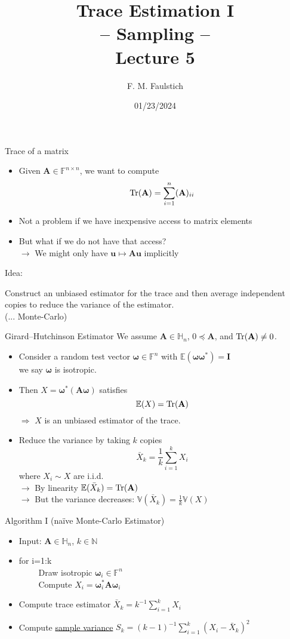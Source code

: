 \documentclass{beamer}
\title{
Trace Estimation I\\
-- Sampling -- \\
Lecture 5
}
\author{F. M. Faulstich}
\date{01/23/2024}
\newcommand{\bgk}[1]{\boldsymbol{#1}}
\newcommand{\bomega}{\bgk{\omega}}
\newcommand{\bvec}[1]{\mathbf{#1}}
\newcommand{\vu}{\bvec{u}}
\newcommand{\vA}{\bvec{A}}
\newcommand{\vI}{\bvec{I}}
\newcommand{\bitem}{\item[$\bullet$]}
\begin{document}
\frame{\titlepage}

\begin{frame}{Trace of a matrix}

\begin{itemize}
    \bitem Given $\vA \in \mathbb{F}^{n\times n}$, we want to compute
$$
{\rm Tr}(\vA) = \sum_{i=1}^{n} (\vA)_{ii} 
$$
\bitem Not a problem if we have inexpensive access to matrix elements
\bitem But what if we do not have that access?\\
$\rightarrow$ We might only have $\vu \mapsto \vA \vu$ implicitly
\end{itemize}

 

Idea:\\
\begin{center}
Construct an unbiased estimator for the trace and then average independent copies to reduce the variance of the estimator. \\
\pause
(... Monte-Carlo)
\end{center}
    
\end{frame}


\begin{frame}{Girard--Hutchinson Estimator}
We assume $\vA \in \mathbb{H}_n$, $0 \preccurlyeq \vA$, and ${\rm Tr}(\vA) \neq 0$.
\begin{itemize}
    \bitem Consider a random test vector $\bomega\in\mathbb{F}^n$ with $\mathbb{E}(\bomega \bomega^*) = \vI$\\
    we say $\bomega$ is isotropic.
    \bitem Then $X = \bomega^* (\vA \bomega)$ satisfies
    $$
    \mathbb{E}(X) = {\rm Tr}(\vA)
    $$
    $\Rightarrow$ $X$ is an unbiased estimator of the trace.
    \pause 
    \bitem [Girard--Hutchinson Estimator] Reduce the variance by taking $k$ copies
    $$
    \bar{X}_k = \frac{1}{k}\sum_{i=1}^k X_i
    $$
    where $X_i \sim X$ are i.i.d.\\
    $\rightarrow$ By linearity $\mathbb{E}(\bar{X}_k) = {\rm Tr}(\vA)$\\
    $\rightarrow$ But the variance decreases: $\mathbb{V}(\bar{X}_k) = \frac{1}{k}\mathbb{V}(X)$
\end{itemize}
\end{frame}



\begin{frame}{Algorithm I (na\"ive  Monte-Carlo Estimator)}

\begin{itemize}
    \bitem Input: $\vA\in\mathbb{H}_n$, $k \in \mathbb{N}$
    \bitem for i=1:k\\
    $\qquad$ Draw isotropic $\bomega_i \in \mathbb{F}^n$\\
    $\qquad$ Compute $X_i= \bomega_i^* \vA \bomega_i$
    \bitem Compute trace estimator $\bar{X}_k = k^{-1}\sum_{i=1}^k X_i$
    \bitem Compute \underline{sample variance} $S_k = (k-1)^{-1}\sum_{i=1}^k (X_i - \bar{X}_k)^2$
\end{itemize}


\end{frame}
\end{document}
